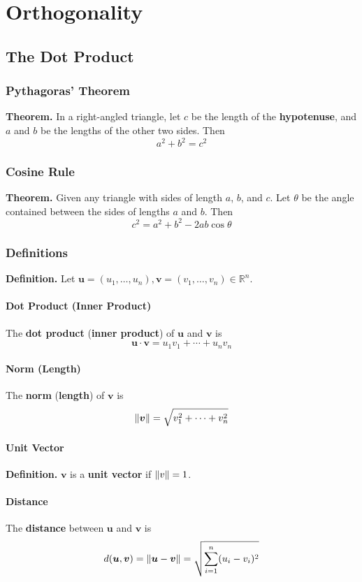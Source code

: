 \documentclass[../ma2001_notes.tex]{subfiles}
\begin{document}
\chapter{Orthogonality}

\section{The Dot Product}
\subsection{Pythagoras' Theorem}
\textbf{Theorem.} In a right-angled triangle, let \(c\) be the length of the \textbf{hypotenuse}, and \(a\) and \(b\) be the lengths of the other two sides. Then
\[a^2+b^2=c^2\]

\subsection{Cosine Rule}
\textbf{Theorem.} Given any triangle with sides of length \(a\), \(b\), and \(c\). Let \(\theta\) be the angle contained between the sides of lengths \(a\) and \(b\). Then
\[c^2=a^2+b^2-2ab\cos\theta\]

\subsection{Definitions}
\textbf{Definition.} Let \(\bm{u}=(u_1,\ldots,u_n),\bm{v}=(v_1,\ldots,v_n)\in\mathbb{R}^n\).

\subsubsection{Dot Product (Inner Product)}
The \textbf{dot product} (\textbf{inner product}) of \(\bm{u}\) and \(\bm{v}\) is
\[\bm{u}\cdot\bm{v}=u_1v_1+\cdots+u_nv_n\]

\subsubsection{Norm (Length)}
The \textbf{norm} (\textbf{length}) of \(\bm{v}\) is
\[\lVert\bm{v}\rVert=\sqrt{v_1^2+\cdots+v_n^2}\]

\subsubsection{Unit Vector}
\textbf{Definition.} \(\bm{v}\) is a \textbf{unit vector} if \(\lVert v\rVert=1\).

\subsubsection{Distance}
The \textbf{distance} between \(\bm{u}\) and \(\bm{v}\) is
\[d(\bm{u},\bm{v})=\lVert\bm{u}-\bm{v}\rVert=\sqrt{\sum_{i=1}^n(u_i-v_i)^2}\]
\end{document}

